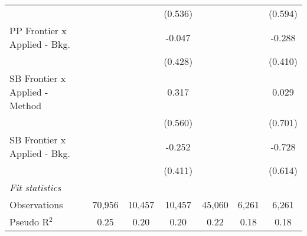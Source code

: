\begin{tabular}{lcccccc}
                                  &               &               & (0.536)        &               &               & (0.594)\\   
   PP Frontier x Applied - Bkg.   &               &               & -0.047         &               &               & -0.288\\   
                                  &               &               & (0.428)        &               &               & (0.410)\\   
   SB Frontier x Applied - Method &               &               & 0.317          &               &               & 0.029\\   
                                  &               &               & (0.560)        &               &               & (0.701)\\   
   SB Frontier x Applied - Bkg.   &               &               & -0.252         &               &               & -0.728\\   
                                  &               &               & (0.411)        &               &               & (0.614)\\   
   \midrule
   \emph{Fit statistics}\\
   Observations                   & 70,956        & 10,457        & 10,457         & 45,060        & 6,261         & 6,261\\  
   Pseudo R$^2$                   & 0.25          & 0.20          & 0.20           & 0.22          & 0.18          & 0.18\\  
   

\end{tabular}
